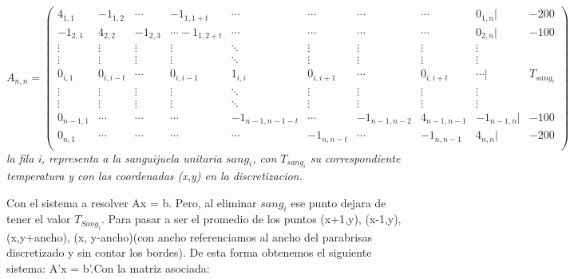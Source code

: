 \documentclass[a4paper]{article}
\begin{document}
$$
A_{n,n} =
 \begin{pmatrix}
  4_{1,1} & -1_{1,2} & \cdots & -1_{1,1+t} & \cdots & \cdots & \cdots & \cdots  & 0_{1,n} | & -200 \\
   -1_{2,1} & 4_{2,2} & -1_{2,3} & \cdots -1_{1,2+t} & \cdots & \cdots & \cdots & \cdots & 0_{2,n} | & -100 \\
  \vdots  & \vdots  & \vdots & \vdots  & \ddots & \vdots  & \vdots & \vdots & \vdots\\
  \vdots  & \vdots & \vdots & \vdots  & \ddots & \vdots  & \vdots & \vdots & \vdots\\
   0_{i,1} & 0_{i,i-t} & \cdots & 0_{i,i-1} & 1_{i,i} &  0_{i,i+1} & \cdots & 0_{i,i+t} & \cdots | & T_{sang_i} \\
  \vdots  & \vdots  & \vdots & \vdots  & \ddots  & \vdots  & \vdots & \vdots & \vdots\\
  \vdots  & \vdots  & \vdots & \vdots  & \ddots  & \vdots  & \vdots & \vdots & \vdots\\
   0_{n-1,1} & \cdots & \cdots & \cdots & -1_{n-1,n-1-t} & \cdots & -1_{n-1,n-2} & 4_{n-1,n-1} &  -1_{n-1,n} | & -100 \\
   0_{n,1} & \cdots & \cdots & \cdots & \cdots & -1_{n,n-t} & \cdots & -1_{n,n-1} &  4_{n,n} | & -200 \\
 \end{pmatrix}
$$
\textit{la fila i, representa a la sanguijuela unitaria $sang_i$, con $T_{sang_i}$ su correspondiente temperatura y con las coordenadas (x,y) en la discretizacion.}\newline

Con el sistema a resolver Ax = b.\newline
Pero, al eliminar $sang_i$ ese punto dejara de tener el valor $T_{Sang_i}$. Para pasar a ser el promedio de los puntos (x+1,y), (x-1,y), (x,y+ancho), (x, y-ancho)(con ancho referenciamos al ancho del parabrisas discretizado y sin contar los bordes). De esta forma obtenemos el siguiente sistema: A'x = b'.\newline Con la matriz asociada:
\end{document}
